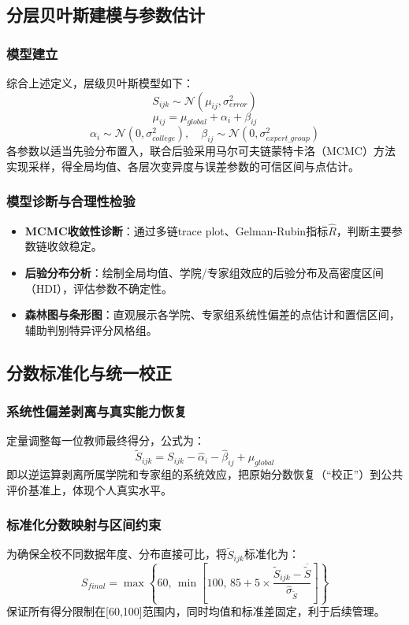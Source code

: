 \subsection{分层贝叶斯建模与参数估计}
\subsubsection{模型建立}
综合上述定义，层级贝叶斯模型如下：
\[
S_{ijk} \sim \mathcal{N}(\mu_{ij}, \sigma_{error}^2)
\]
\[
\mu_{ij} = \mu_{global} + \alpha_i + \beta_{ij}
\]
\[
\alpha_{i} \sim \mathcal{N}(0, \sigma_{college}^2),\quad \beta_{ij} \sim \mathcal{N}(0, \sigma_{expert\_group}^2)
\]
各参数以适当先验分布置入，联合后验采用马尔可夫链蒙特卡洛（MCMC）方法实现采样，得全局均值、各层次变异度与误差参数的可信区间与点估计。

\subsubsection{模型诊断与合理性检验}
\begin{itemize}
    \item \textbf{MCMC收敛性诊断}：通过多链trace plot、Gelman-Rubin指标$\hat{R}$，判断主要参数链收敛稳定。
    \item \textbf{后验分布分析}：绘制全局均值、学院/专家组效应的后验分布及高密度区间（HDI），评估参数不确定性。
    \item \textbf{森林图与条形图}：直观展示各学院、专家组系统性偏差的点估计和置信区间，辅助判别特异评分风格组。
\end{itemize}

\subsection{分数标准化与统一校正}
\subsubsection{系统性偏差剥离与真实能力恢复}
定量调整每一位教师最终得分，公式为：
\[
\widetilde{S}_{ijk} = S_{ijk} - \hat{\alpha}_i - \hat{\beta}_{ij} + \mu_{global}
\]
即以逆运算剥离所属学院和专家组的系统效应，把原始分数恢复（“校正”）到公共评价基准上，体现个人真实水平。

\subsubsection{标准化分数映射与区间约束}
为确保全校不同数据年度、分布直接可比，将$\widetilde{S}_{ijk}$标准化为：
\[
S_{final} = \max\left\{ 60,\, \min\left[ 100,\, 85 + 5\times \frac{\widetilde{S}_{ijk} - \overline{\widetilde{S}}}{\widehat{\sigma}_{\widetilde{S}}} \right]\right\}
\]
保证所有得分限制在[60,100]范围内，同时均值和标准差固定，利于后续管理。

